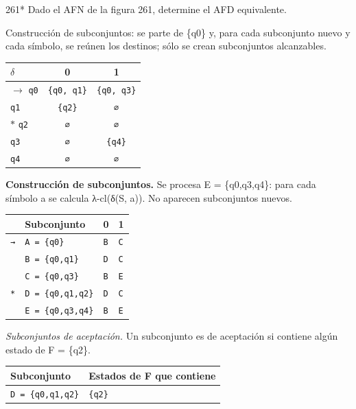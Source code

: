 \documentclass[11pt]{article}
\begin{document}
\begin{ejercicio}{261}{*}
Dado el AFN de la figura 261, determine el AFD equivalente.
\end{ejercicio}
\proc Construcción de subconjuntos: se parte de \{q0\} y, para cada subconjunto nuevo y cada símbolo, se reúnen los destinos; sólo se crean subconjuntos alcanzables.
\begin{center}\small\begin{tabular}{lcc}\toprule
$\delta$ & 0 & 1 \\\midrule
$\to$ \texttt{q0} & \texttt{\{q0, q1\}} & \texttt{\{q0, q3\}} \\
 \texttt{q1} & \texttt{\{q2\}} & \texttt{∅} \\
$*$ \texttt{q2} & \texttt{∅} & \texttt{∅} \\
 \texttt{q3} & \texttt{∅} & \texttt{\{q4\}} \\
 \texttt{q4} & \texttt{∅} & \texttt{∅} \\
\bottomrule\end{tabular}\end{center}
\textbf{Construcción de subconjuntos.} Se procesa E = \{q0,q3,q4\}: para cada símbolo a se calcula λ-cl(δ(S, a)). No aparecen subconjuntos nuevos.
\begin{center}\footnotesize\begin{tabular}{llll}\toprule
 & Subconjunto & 0 & 1 \\\midrule
\texttt{→} & \texttt{A = \{q0\}} & \texttt{B} & \texttt{C} \\
\texttt{} & \texttt{B = \{q0,q1\}} & \texttt{D} & \texttt{C} \\
\texttt{} & \texttt{C = \{q0,q3\}} & \texttt{B} & \texttt{E} \\
\texttt{*} & \texttt{D = \{q0,q1,q2\}} & \texttt{D} & \texttt{C} \\
\texttt{} & \texttt{E = \{q0,q3,q4\}} & \texttt{B} & \texttt{E} \\
\bottomrule\end{tabular}\end{center}
\textit{Subconjuntos de aceptación.} Un subconjunto es de aceptación si contiene algún estado de F = \{q2\}.
\begin{center}\footnotesize\begin{tabular}{ll}\toprule
Subconjunto & Estados de F que contiene \\\midrule
\texttt{D = \{q0,q1,q2\}} & \texttt{\{q2\}} \\
\bottomrule\end{tabular}\end{center}
\end{document}
